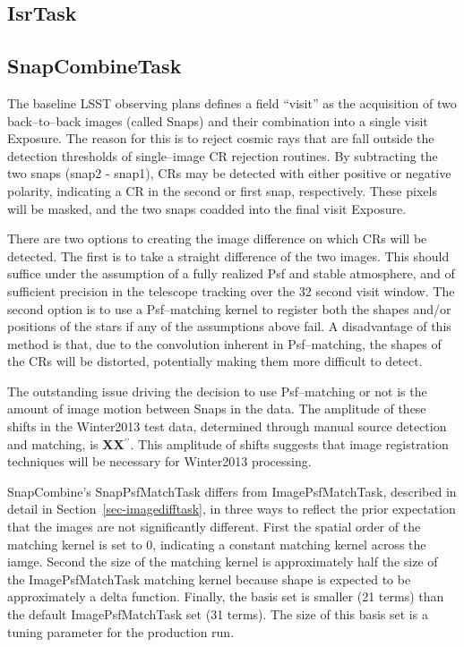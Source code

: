 \documentclass[12pt]{article}
\def\arcsec{^{\prime\prime}}
\begin{document}
\subsection{IsrTask}

\subsection{SnapCombineTask}

The baseline LSST observing plans defines a field ``visit'' as the
acquisition of two back--to--back images (called Snaps) and their
combination into a single visit Exposure.  The reason for this is to
reject cosmic rays that are fall outside the detection thresholds of
single--image CR rejection routines.  By subtracting the two snaps
(snap2 - snap1), CRs may be detected with either positive or negative
polarity, indicating a CR in the second or first snap, respectively.
These pixels will be masked, and the two snaps coadded into the final
visit Exposure.

There are two options to creating the image difference on which CRs
will be detected.  The first is to take a straight difference of the
two images.  This should suffice under the assumption of a fully
realized Psf and stable atmosphere, and of sufficient precision in the
telescope tracking over the 32 second visit window.  The second option
is to use a Psf--matching kernel to register both the shapes and/or
positions of the stars if any of the assumptions above fail.  A
disadvantage of this method is that, due to the convolution inherent
in Psf--matching, the shapes of the CRs will be distorted, potentially
making them more difficult to detect.

The outstanding issue driving the decision to use Psf--matching or not
is the amount of image motion between Snaps in the data.  The
amplitude of these shifts in the Winter2013 test data, determined
through manual source detection and matching, is {\bf XX}$\arcsec$.
This amplitude of shifts suggests that image registration techniques
will be necessary for Winter2013 processing. 

SnapCombine's SnapPsfMatchTask differs from ImagePsfMatchTask,
described in detail in Section~\ref{sec-imagedifftask}, in three ways
to reflect the prior expectation that the images are not significantly
different.  First the spatial order of the matching kernel is set to
0, indicating a constant matching kernel across the iamge.  Second the
size of the matching kernel is approximately half the size of the
ImagePsfMatchTask matching kernel because shape is expected to be
approximately a delta function.  Finally, the basis set is smaller (21
terms) than the default ImagePsfMatchTask set (31 terms).  The size of
this basis set is a tuning parameter for the production run.
\end{document}
